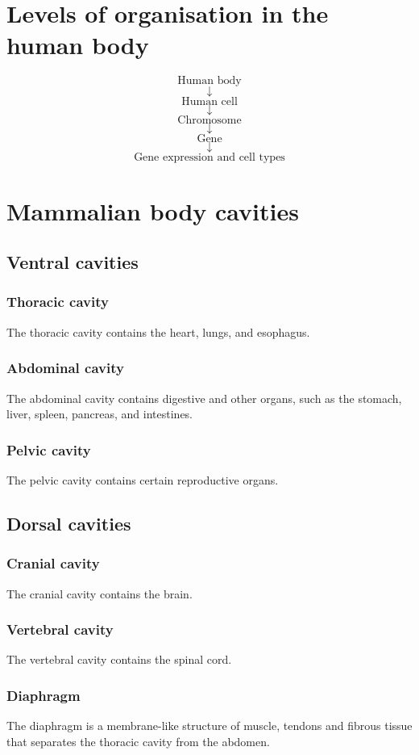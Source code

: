 \documentclass[11pt]{article}
\begin{document}
\newpage
\section{Levels of organisation in the human body}
\label{sec:org8af1188}
\[\text{Human body}\]
\[\downarrow\]
\[\text{Human cell}\]
\[\downarrow\]
\[\text{Chromosome}\]
\[\downarrow\]
\[\text{Gene}\]
\[\downarrow\]
\[\text{Gene expression and cell types}\]
\section{Mammalian body cavities}
\label{sec:orgc196663}

\subsection{Ventral cavities}
\label{sec:org07bc2dd}

\subsubsection{Thoracic cavity}
\label{sec:org99c2bb3}
The thoracic cavity contains the heart, lungs, and esophagus.
\subsubsection{Abdominal cavity}
\label{sec:org53180ab}
The abdominal cavity contains digestive and other organs, such as the stomach, liver, spleen, pancreas, and intestines.
\subsubsection{Pelvic cavity}
\label{sec:org5ef4547}
The pelvic cavity contains certain reproductive organs.
\subsection{Dorsal cavities}
\label{sec:orgabc0a1b}

\subsubsection{Cranial cavity}
\label{sec:orgb57d167}
The cranial cavity contains the brain.
\subsubsection{Vertebral cavity}
\label{sec:org6398c16}
The vertebral cavity contains the spinal cord.
\subsubsection{Diaphragm}
\label{sec:org466a907}
The diaphragm is a membrane-like structure of muscle, tendons and fibrous tissue that separates the thoracic cavity from the abdomen.
\end{document}
